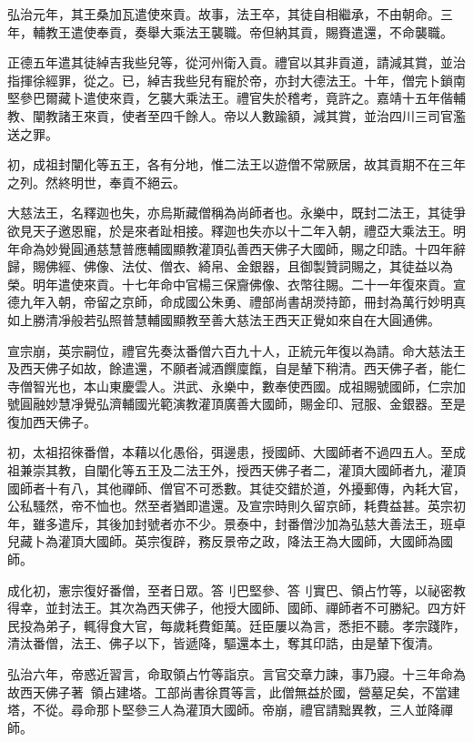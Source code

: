 \begin{pinyinscope}
弘治元年，其王桑加瓦遣使來貢。故事，法王卒，其徒自相繼承，不由朝命。三年，輔教王遣使奉貢，奏舉大乘法王襲職。帝但納其貢，賜賚遣還，不命襲職。

正德五年遣其徒綽吉我些兒等，從河州衛入貢。禮官以其非貢道，請減其賞，並治指揮徐經罪，從之。已，綽吉我些兒有寵於帝，亦封大德法王。十年，僧完卜鎖南堅參巴爾藏卜遣使來貢，乞襲大乘法王。禮官失於稽考，竟許之。嘉靖十五年偕輔教、闡教諸王來貢，使者至四千餘人。帝以人數踰額，減其賞，並治四川三司官濫送之罪。

初，成祖封闡化等五王，各有分地，惟二法王以遊僧不常厥居，故其貢期不在三年之列。然終明世，奉貢不絕云。

大慈法王，名釋迦也失，亦烏斯藏僧稱為尚師者也。永樂中，既封二法王，其徒爭欲見天子邀恩寵，於是來者趾相接。釋迦也失亦以十二年入朝，禮亞大乘法王。明年命為妙覺圓通慈慧普應輔國顯教灌頂弘善西天佛子大國師，賜之印誥。十四年辭歸，賜佛經、佛像、法仗、僧衣、綺帛、金銀器，且御製贊詞賜之，其徒益以為榮。明年遣使來貢。十七年命中官楊三保齎佛像、衣幣往賜。二十一年復來貢。宣德九年入朝，帝留之京師，命成國公朱勇、禮部尚書胡濙持節，冊封為萬行妙明真如上勝清凈般若弘照普慧輔國顯教至善大慈法王西天正覺如來自在大圓通佛。

宣宗崩，英宗嗣位，禮官先奏汰番僧六百九十人，正統元年復以為請。命大慈法王及西天佛子如故，餘遣還，不願者減酒饌廩餼，自是輦下稍清。西天佛子者，能仁寺僧智光也，本山東慶雲人。洪武、永樂中，數奉使西國。成祖賜號國師，仁宗加號圓融妙慧凈覺弘濟輔國光範演教灌頂廣善大國師，賜金印、冠服、金銀器。至是復加西天佛子。

初，太祖招徠番僧，本藉以化愚俗，弭邊患，授國師、大國師者不過四五人。至成祖兼崇其教，自闡化等五王及二法王外，授西天佛子者二，灌頂大國師者九，灌頂國師者十有八，其他禪師、僧官不可悉數。其徒交錯於道，外擾郵傳，內耗大官，公私騷然，帝不恤也。然至者猶即遣還。及宣宗時則久留京師，耗費益甚。英宗初年，雖多遣斥，其後加封號者亦不少。景泰中，封番僧沙加為弘慈大善法王，班卓兒藏卜為灌頂大國師。英宗復辟，務反景帝之政，降法王為大國師，大國師為國師。

成化初，憲宗復好番僧，至者日眾。答刂巴堅參、答刂實巴、領占竹等，以祕密教得幸，並封法王。其次為西天佛子，他授大國師、國師、禪師者不可勝紀。四方奸民投為弟子，輒得食大官，每歲耗費鉅萬。廷臣屢以為言，悉拒不聽。孝宗踐阼，清汰番僧，法王、佛子以下，皆遞降，驅還本土，奪其印誥，由是輦下復清。

弘治六年，帝惑近習言，命取領占竹等詣京。言官交章力諫，事乃寢。十三年命為故西天佛子著領占建塔。工部尚書徐貫等言，此僧無益於國，營墓足矣，不當建塔，不從。尋命那卜堅參三人為灌頂大國師。帝崩，禮官請黜異教，三人並降禪師。


\end{pinyinscope}
